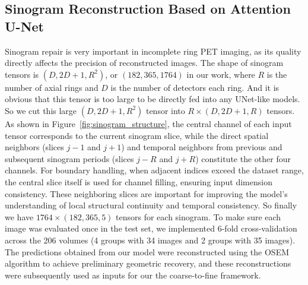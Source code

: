 \documentclass[12pt]{iopart}
\begin{document}

\subsection{Sinogram Reconstruction Based on Attention U-Net}
\label{sec:unet_sinogram}

Sinogram repair is very important in incomplete ring PET imaging, as its quality directly affects the precision of reconstructed images. 
The shape of sinogram tensors is $(D, 2D+1, R^2)$, or $(182, 365, 1764)$ in our work, where $R$ is the number of axial rings and $D$ is the number of detectors each ring. And it is obvious that this tensor is too large to be directly fed into any UNet-like models. So we cut this large $(D, 2D+1, R^2)$ tensor into $R\times(D, 2D+1, R)$ tensors. 
As shown in Figure~\ref{fig:sinogram_structure}, the central channel of each input tensor corresponds to the current sinogram slice, while the direct spatial neighbors (slices $j-1$ and $j+1$) and temporal neighbors from previous and subsequent sinogram periods (slices $j-R$ and $j+R$) constitute the other four channels. For boundary handling, when adjacent indices exceed the dataset range, the central slice itself is used for channel filling, ensuring input dimension consistency. These neighboring slices are important for improving the model's understanding of local structural continuity and temporal consistency. So finally we have $1764\times(182, 365, 5)$ tensors for each sinogram. 
To make sure each image was evaluated once in the test set, we implemented 6-fold cross-validation across the 206 volumes (4 groups with 34 images and 2 groups with 35 images). The predictions obtained from our model were reconstructed using the OSEM algorithm to achieve preliminary geometric recovery, and these reconstructions were subsequently used as inputs for our the coarse-to-fine framework.
\end{document}
